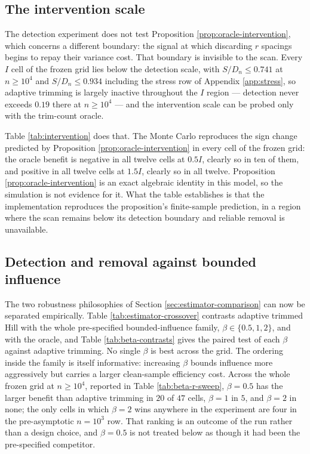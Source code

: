 \documentclass[11pt]{article}
\begin{document}
\subsection{The intervention scale}

The detection experiment does not test Proposition
\ref{prop:oracle-intervention}, which concerns a different boundary: the signal
at which discarding $r$ spacings begins to repay their variance cost.  That
boundary is invisible to the scan.  Every $I$ cell of the frozen grid lies
below the detection scale, with $S/D_n\le0.741$ at $n\ge10^4$ and
$S/D_n\le0.934$ including the stress row of Appendix \ref{app:stress}, so
adaptive trimming is largely inactive throughout the $I$ region --- detection
never exceeds $0.19$ there at $n\ge10^4$ --- and the intervention scale can be
probed only with the trim-count oracle.

Table \ref{tab:intervention} does that.  The Monte Carlo reproduces the sign
change predicted by Proposition \ref{prop:oracle-intervention} in every cell of
the frozen grid: the oracle benefit is negative in all twelve cells at $0.5I$,
clearly so in ten of them, and positive in all twelve cells at $1.5I$,
clearly so in all twelve.  Proposition \ref{prop:oracle-intervention} is
an exact algebraic identity in this model, so the simulation is not evidence
for it.  What the table establishes is that the implementation reproduces the
proposition's finite-sample prediction, in a region where the scan remains
below its detection boundary and reliable removal is unavailable.



\FloatBarrier

\subsection{Detection and removal against bounded influence}

The two robustness philosophies of Section \ref{sec:estimator-comparison} can
now be separated empirically.  Table \ref{tab:estimator-crossover} contrasts
adaptive trimmed Hill with the whole pre-specified bounded-influence family,
$\beta\in\{0.5,1,2\}$, and with the oracle, and Table \ref{tab:beta-contrasts}
gives the paired test of each $\beta$ against adaptive trimming.  No single
$\beta$ is best across the grid.  The ordering inside the family is itself
informative: increasing $\beta$ bounds influence more aggressively but carries
a larger clean-sample efficiency cost.  Across the whole frozen grid at $n\ge10^4$, reported in
Table \ref{tab:beta-r-sweep}, $\beta=0.5$ has the larger benefit than adaptive
trimming in $20$ of $47$ cells, $\beta=1$ in $5$, and $\beta=2$ in none; the
only cells in which $\beta=2$ wins anywhere in the experiment are four in the
pre-asymptotic $n=10^3$ row.  That ranking is an outcome of the run rather than
a design choice, and $\beta=0.5$ is not treated below as though it had been the
pre-specified competitor.
\end{document}

